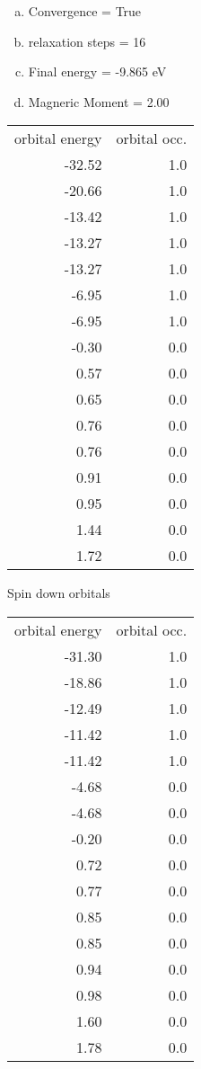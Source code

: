 \documentclass[11pt]{article}
\begin{document}
\begin{enumerate}[(a)]
\item Convergence = True
\item relaxation steps = 16
\item Final energy = -9.865 eV
\item Magneric Moment = 2.00
\end{enumerate}
\begin{center}
\begin{tabular}{rr}
orbital energy & orbital occ.\\
-32.52 & 1.0\\
-20.66 & 1.0\\
-13.42 & 1.0\\
-13.27 & 1.0\\
-13.27 & 1.0\\
-6.95 & 1.0\\
-6.95 & 1.0\\
-0.30 & 0.0\\
0.57 & 0.0\\
0.65 & 0.0\\
0.76 & 0.0\\
0.76 & 0.0\\
0.91 & 0.0\\
0.95 & 0.0\\
1.44 & 0.0\\
1.72 & 0.0\\
\end{tabular}
\end{center}

Spin down orbitals
\begin{center}
\begin{tabular}{rr}
orbital energy & orbital occ.\\
-31.30 & 1.0\\
-18.86 & 1.0\\
-12.49 & 1.0\\
-11.42 & 1.0\\
-11.42 & 1.0\\
-4.68 & 0.0\\
-4.68 & 0.0\\
-0.20 & 0.0\\
0.72 & 0.0\\
0.77 & 0.0\\
0.85 & 0.0\\
0.85 & 0.0\\
0.94 & 0.0\\
0.98 & 0.0\\
1.60 & 0.0\\
1.78 & 0.0\\
\end{tabular}
\end{center}
\end{document}
